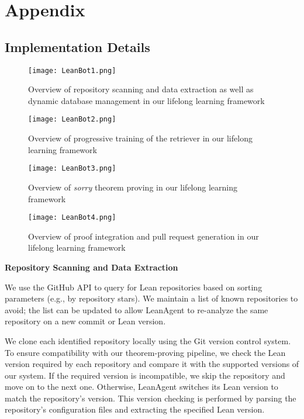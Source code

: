 \documentclass{article} %
\begin{document}




\appendix
\section{Appendix}

\subsection{Implementation Details}
\label{sec:implementation_details}

\begin{figure}[!ht]
    \centering
    \texttt{[image: LeanBot1.png]}
    \caption{Overview of repository scanning and data extraction as well as dynamic database management in our lifelong learning framework}
    \label{fig:leanbot1}
\end{figure}

\begin{figure}[!ht]
    \centering
    \texttt{[image: LeanBot2.png]}
    \caption{Overview of progressive training of the retriever in our lifelong learning framework}
    \label{fig:leanbot2}
\end{figure}

\begin{figure}[!ht]
    \centering
    \texttt{[image: LeanBot3.png]}
    \caption{Overview of \textit{sorry} theorem proving in our lifelong learning framework}
    \label{fig:leanbot3}
\end{figure}

\begin{figure}[!ht]
    \centering
    \texttt{[image: LeanBot4.png]}
    \caption{Overview of proof integration and pull request generation in our lifelong learning framework}
    \label{fig:leanbot4}
\end{figure}

\textbf{Repository Scanning and Data Extraction}

We use the GitHub API to query for Lean repositories based on sorting parameters (e.g., by repository stars). We maintain a list of known repositories to avoid; the list can be updated to allow LeanAgent to re-analyze the same repository on a new commit or Lean version.

We clone each identified repository locally using the Git version control system. To ensure compatibility with our theorem-proving pipeline, we check the Lean version required by each repository and compare it with the supported versions of our system. If the required version is incompatible, we skip the repository and move on to the next one. Otherwise, LeanAgent switches its Lean version to match the repository's version. This version checking is performed by parsing the repository's configuration files and extracting the specified Lean version.
\end{document}
